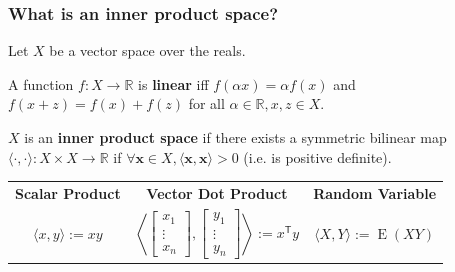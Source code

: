 \documentclass{beamer}
\begin{document}
\begin{frame}
        \frametitle{What is an inner product space?}
        Let $X$ be a vector space over the reals.
        \begin{definition}
            A function $f: X \rightarrow \mathbb R$ is \textbf{linear} iff $f(\alpha x)= \alpha f(x)$
            and $f(x+z)=f(x)+f(z)$ for all $\alpha\in\mathbb R, x,z \in X$.
        \end{definition}

        \begin{definition}
            $X$ is an \textbf{inner product space} if there exists a symmetric bilinear map $\langle \cdot ,\cdot \rangle :X\times X\to \mathbb R$ if $\forall \mathbf x \in X, \langle \mathbf x,\mathbf x \rangle > 0$ (i.e. is positive definite).
        \end{definition}
        \begin{center}
            \begin{tabular}{ c c c }
                \textbf{Scalar Product} & \textbf{Vector Dot Product} & \textbf{Random Variable} \\
                $\langle x,y\rangle := xy$ &
                $\left\langle {\begin{bmatrix}x_{1}\\\vdots \\x_{n}\end{bmatrix}},{\begin{bmatrix}y_{1}\\\vdots \\y_{n}\end{bmatrix}}\right\rangle :=x^{\textsf {T}}y$ &
                $\langle X,Y\rangle :=\operatorname {E} (XY)$
            \end{tabular}
        \end{center}
    \end{frame}
\end{document}
